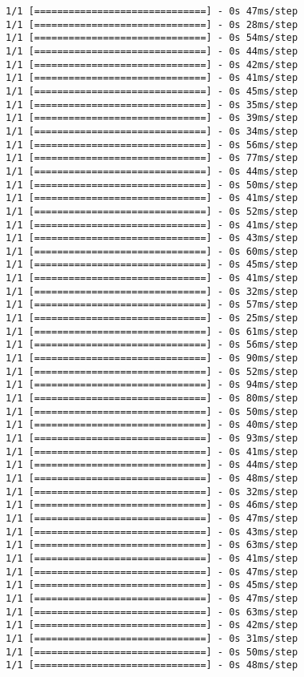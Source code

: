 \documentclass[11pt]{article}
\begin{document}
\begin{Verbatim}[commandchars=\\\{\}]
1/1 [==============================] - 0s 47ms/step
1/1 [==============================] - 0s 28ms/step
1/1 [==============================] - 0s 54ms/step
1/1 [==============================] - 0s 44ms/step
1/1 [==============================] - 0s 42ms/step
1/1 [==============================] - 0s 41ms/step
1/1 [==============================] - 0s 45ms/step
1/1 [==============================] - 0s 35ms/step
1/1 [==============================] - 0s 39ms/step
1/1 [==============================] - 0s 34ms/step
1/1 [==============================] - 0s 56ms/step
1/1 [==============================] - 0s 77ms/step
1/1 [==============================] - 0s 44ms/step
1/1 [==============================] - 0s 50ms/step
1/1 [==============================] - 0s 41ms/step
1/1 [==============================] - 0s 52ms/step
1/1 [==============================] - 0s 41ms/step
1/1 [==============================] - 0s 43ms/step
1/1 [==============================] - 0s 60ms/step
1/1 [==============================] - 0s 45ms/step
1/1 [==============================] - 0s 41ms/step
1/1 [==============================] - 0s 32ms/step
1/1 [==============================] - 0s 57ms/step
1/1 [==============================] - 0s 25ms/step
1/1 [==============================] - 0s 61ms/step
1/1 [==============================] - 0s 56ms/step
1/1 [==============================] - 0s 90ms/step
1/1 [==============================] - 0s 52ms/step
1/1 [==============================] - 0s 94ms/step
1/1 [==============================] - 0s 80ms/step
1/1 [==============================] - 0s 50ms/step
1/1 [==============================] - 0s 40ms/step
1/1 [==============================] - 0s 93ms/step
1/1 [==============================] - 0s 41ms/step
1/1 [==============================] - 0s 44ms/step
1/1 [==============================] - 0s 48ms/step
1/1 [==============================] - 0s 32ms/step
1/1 [==============================] - 0s 46ms/step
1/1 [==============================] - 0s 47ms/step
1/1 [==============================] - 0s 43ms/step
1/1 [==============================] - 0s 63ms/step
1/1 [==============================] - 0s 41ms/step
1/1 [==============================] - 0s 47ms/step
1/1 [==============================] - 0s 45ms/step
1/1 [==============================] - 0s 47ms/step
1/1 [==============================] - 0s 63ms/step
1/1 [==============================] - 0s 42ms/step
1/1 [==============================] - 0s 31ms/step
1/1 [==============================] - 0s 50ms/step
1/1 [==============================] - 0s 48ms/step

\end{Verbatim}
\end{document}
